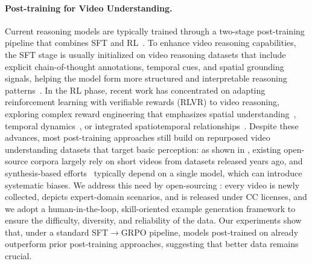 \paragraph{Post-training for Video Understanding.}
Current reasoning models are typically trained through a two-stage post-training pipeline that combines SFT and RL~\cite{guo2025deepseek, team2025kimi, yang2025qwen3, li2025perceptionreasonthinkplan}.
To enhance video reasoning capabilities, the SFT stage is usually initialized on video reasoning datasets that include explicit chain-of-thought annotations, temporal cues, and spatial grounding signals, helping the model form more structured and interpretable reasoning patterns~\cite{videoglamm,videostar,longvitu,feng2025onethinker,wang2025video}.
In the RL phase, recent work has concentrated on adapting reinforcement learning with verifiable rewards (RLVR) to video reasoning, exploring complex reward engineering that emphasizes spatial understanding~\cite{spacer,Tang2025VideoSR}, temporal dynamics~\cite{timer1, TVGR1, videor1, zhao2025videoperceiver}, or integrated spatiotemporal relationships~\cite{Open-o3, Tang2025VideoR4RT}.
Despite these advances, most post-training approaches still build on repurposed video understanding datasets that target basic perception: as shown in , existing open-source corpora largely rely on short videos from datasets released years ago, and synthesis-based efforts~\cite{Zhang2024LLaVAVideoVI, videoespresso} typically depend on a single model, which can introduce systematic biases.
We address this need by open-sourcing \ours: every video is newly collected, depicts expert-domain scenarios, and is released under CC licenses, and we adopt a human-in-the-loop, skill-oriented example generation framework to ensure the difficulty, diversity, and reliability of the data.
Our experiments show that, under a standard SFT$\rightarrow$GRPO pipeline, models post-trained on \ours already outperform prior post-training approaches, suggesting that better data remains crucial.
